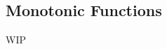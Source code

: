 \documentclass[../poma-notes.tex]{subfiles}
\begin{document}
\subsection*{Monotonic Functions}

WIP
\end{document}
